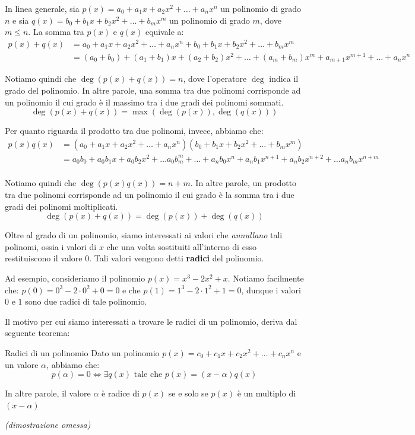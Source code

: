 \documentclass[a4paper, 12pt]{report}
\begin{document}
    In linea generale, sia $p(x) = a_0 + a_1x + a_2x^2 + \ldots + a_n x^n$ un polinomio di grado $n$ e sia $q(x) = b_0 + b_1x + b_2x^2 + \ldots + b_m x^m$ un polinomio di grado $m$, dove $m \leq n$. La somma tra $p(x)$ e $q(x)$ equivale a:
    \[\begin{split}
        p(x) + q(x) & = a_0 + a_1x + a_2x^2 + \ldots + a_n x^n + b_0 + b_1x + b_2x^2 + \ldots + b_m x^m \\
        &= (a_0+b_0) + (a_1+b_1)x + (a_2+b_2)x^2 + \ldots + (a_m+b_m) x^m + a_{m+1} x^{m+1} +\ldots + a_nx^n
    \end{split}\]

    Notiamo quindi che $\deg(p(x) + q(x)) = n$, dove l'operatore $\deg$ indica il grado del polinomio. In altre parole, una somma tra due polinomi corrisponde ad un polinomio il cui grado è il massimo tra i due gradi dei polinomi sommati.
    \[\deg(p(x) + q(x)) = \max(\deg(p(x)), \deg(q(x)))\]

    Per quanto riguarda il prodotto tra due polinomi, invece, abbiamo che:
    \[\begin{split}
        p(x)q(x) &= ( a_0 + a_1x + a_2x^2 + \ldots + a_n x^n)(b_0 + b_1x + b_2x^2 + \ldots + b_m x^m) \\
        &= a_0b_0+a_0b_1x+a_0b_2x^2+\ldots a_0b_m^m + \ldots + a_nb_0x^n+a_nb_1x^{n+1}+a_nb_2x^{n+2}+\ldots a_nb_mx^{n+m} \\
    \end{split}\]

    Notiamo quindi che $\deg(p(x)q(x)) = n + m$. In altre parole, un prodotto tra due polinomi corrisponde ad un polinomio il cui grado è la somma tra i due gradi dei polinomi moltiplicati.
    \[\deg(p(x) + q(x)) = \deg(p(x)) + \deg(q(x))\]

    Oltre al grado di un polinomio, siamo interessati ai valori che \textit{annullano} tali polinomi, ossia i valori di $x$ che una volta sostituiti all'interno di esso restituiscono il valore 0. Tali valori vengono detti \textbf{radici} del polinomio.

    Ad esempio, consideriamo il polinomio $p(x) = x^3-2x^2+x$. Notiamo facilmente che:
    $p(0) = 0^3-2 \cdot 0^2 + 0 = 0$ e che $p(1) = 1^3 - 2 \cdot 1^2 + 1 = 0$, dunque i valori $0$ e $1$ sono due radici di tale polinomio.

    Il motivo per cui siamo interessati a trovare le radici di un polinomio, deriva dal seguente teorema:
    \begin{framedthm}{Radici di un polinomio}
        Dato un polinomio $p(x) = c_0 + c_1x + c_2x^2 + \ldots + c_n x^n$ e un valore $\alpha$, abbiamo che:
        \[p(\alpha) = 0 \iff \exists q(x) \text{ tale che } p(x) = (x-\alpha) q(x)  \]

        In altre parole, il valore $\alpha$ è radice di $p(x)$ se e solo se $p(x)$ è un multiplo di $(x-\alpha)$

        \textit{(dimostrazione omessa)}
    \end{framedthm}
\end{document}
